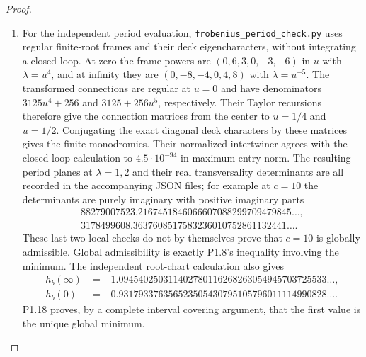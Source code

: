 \begin{proof}
\begin{enumerate}[label=\arabic*.]
\item For the independent period evaluation,
\texttt{frobenius\_period\_check.py} uses regular finite-root frames
and their deck eigencharacters, without integrating a closed loop.
At zero the frame powers are $(0,6,3,0,-3,-6)$ in $u$ with
$\lambda=u^4$, and at infinity they are
$(0,-8,-4,0,4,8)$ with $\lambda=u^{-5}$.
The transformed connections are regular at $u=0$ and have denominators
$3125u^4+256$ and $3125+256u^5$, respectively.
Their Taylor recursions therefore give the connection matrices from
the center to $u=1/4$ and $u=1/2$.  Conjugating the exact diagonal
deck characters by these matrices gives the finite monodromies.
Their normalized intertwiner agrees with the closed-loop calculation
to $4.5\cdot10^{-94}$ in maximum entry norm.
The resulting period planes at $\lambda=1,2$ and their real
transversality determinants are all recorded in the accompanying
JSON files; for example at $c=10$ the determinants are purely imaginary
with positive imaginary parts
\[
\begin{gathered}
88279007523.2167451846066607088299709479845\ldots,\\
3178499608.3637608517583236010752861132441\ldots.
\end{gathered}
\]
These last two local checks do not by themselves prove that $c=10$
is globally admissible.  Global admissibility is exactly P1.8's
inequality involving the minimum.  The independent root-chart
calculation also gives
\[
\begin{split}
h_b(\infty)&=-1.094540250311402780116268263054945703725533\ldots,\\
h_b(0)&=-0.931793376356523505430795105796011114990828\ldots.
\end{split}
\]
P1.18 proves, by a complete interval covering argument, that the
first value is the unique global minimum.

\end{enumerate}
\end{proof}




